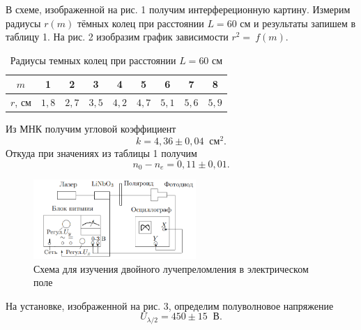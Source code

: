 \documentclass[a4paper]{article}
\begin{document}
В схеме, изображенной на рис. 1 получим интерфереционную картину. Измерим радиусы $r(m)$ тёмных колец при расстоянии $L = 60$ см и результаты запишем в таблицу 1. На рис. 2 изобразим график зависимости $r^2 =~f(m)$.

\begin{table}[!ht]
    \centering
    \caption{Радиусы темных колец при расстоянии $L = 60$ см}
    \begin{tabular}{|c|c|c|c|c|c|c|c|c|}
    \hline
    $m$     & 1     & 2     & 3     & 4     & 5     & 6     & 7     & 8     \\ \hline
    $r$, см & $1,8$ & $2,7$ & $3,5$ & $4,2$ & $4,7$ & $5,1$ & $5,6$ & $5,9$ \\ \hline
    \end{tabular}
\end{table}

\noindent Из МНК получим угловой коэффициент $$k = 4,36 \pm 0,04 \;\; \text{см}^2.$$ Откуда при значениях из таблицы 1 получим $$n_0 - n_e = 0,11 \pm 0,01.$$

\begin{figure}[ht!]
    \centering
    \includegraphics[width = 0.55\textwidth]{image/pic2.png}
    \caption{Схема для изучения двойного лучепреломления в электрическом поле}
\end{figure}

На установке, изображенной на рис. 3, определим полуволновое напряжение $$U_{\lambda / 2} = 450 \pm 15 \;\;\text{В}.$$
\end{document}

